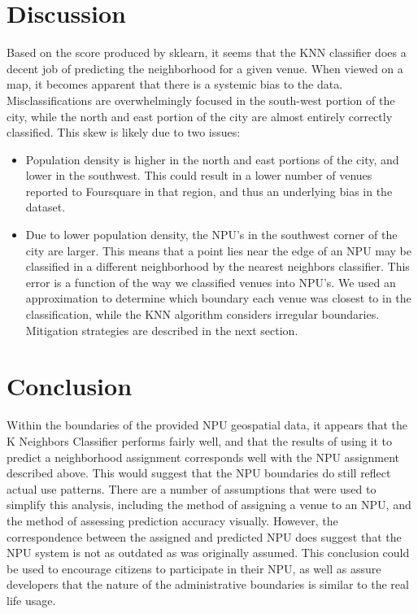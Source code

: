 \documentclass[11pt]{amsart}
\begin{document}
\section{Discussion}
Based on the score produced by sklearn, it seems that the KNN classifier does a decent job of predicting the neighborhood for a given venue. When viewed on a map, it becomes apparent that there is a systemic bias to the data. Misclassifications are overwhelmingly focused in the south-west portion of the city, while the north and east portion of the city are almost entirely correctly classified. 
This skew is likely due to two issues:
\begin{itemize}
\item Population density is higher in the north and east portions of the city, and lower in the southwest. This could result in a lower number of venues reported to Foursquare in that region, and thus an underlying bias in the dataset.
\item Due to lower population density, the NPU's in the southwest corner of the city are larger. This means that a point lies near the edge of an NPU may be classified in a different neighborhood by the nearest neighbors classifier. This error is a function of the way we classified venues into NPU's. We used an approximation to determine which boundary each venue was closest to in the classification, while the KNN algorithm considers irregular boundaries. Mitigation strategies are described in the next section.

\end{itemize}
\section{Conclusion}
Within the boundaries of the provided NPU geospatial data, it appears that the K Neighbors Classifier performs fairly well, and that the results of using it to predict a neighborhood assignment corresponds well with the NPU assignment described above. This would suggest that the NPU boundaries do still reflect actual use patterns. 
There are a number of assumptions that were used to simplify this analysis, including the method of assigning a venue to an NPU, and the method of assessing prediction accuracy visually. However, the correspondence between the assigned and predicted NPU does suggest that the NPU system is not as outdated as was originally assumed. This conclusion could be used to encourage citizens to participate in their NPU, as well as assure developers that the nature of the administrative boundaries is similar to the real life usage. 
\end{document}
